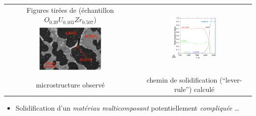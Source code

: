 \begin{frame}[fragile]
\begin{minipage}{0.8\textwidth}
\begin{tabular}{cc}
\tiny{Figures tirées de \cite{Quaini2015} (échantillon $O_{0.39}U_{0.103}Zr_{0.507}$}) & \multirow{2}{*}{\includegraphics[width=0.42\textwidth]{Figures/Fig18a_Quaini2015.png}} \\
\includegraphics[width=0.5\textwidth]{Figures/Fig18b_Quaini2015.png} & \\
\tiny{microstructure observé} & \tiny{chemin de solidification (``lever-rule'') calculé}
\end{tabular}
\end{minipage}
\begin{itemize}
\item Solidification d'un \emph{matériau multicomposant} potentiellement \emph{compliquée} \dots
\end{itemize}
\end{frame}
